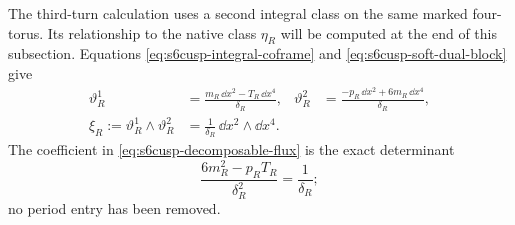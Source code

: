 The third-turn calculation uses a second integral class on the same marked
four-torus.  Its relationship to the native class \(\eta_R\) will be computed
at the end of this subsection.  Equations
\eqref{eq:s6cusp-integral-coframe} and
\eqref{eq:s6cusp-soft-dual-block} give
\begin{align}
 \vartheta_R^1
 &=\frac{m_R\,\dd x^2-T_R\,\dd x^4}{\delta_R},&
 \vartheta_R^2
 &=\frac{-p_R\,\dd x^2+6m_R\,\dd x^4}{\delta_R},
 \label{eq:s6cusp-decomposable-coframe}\\
 \xi_R:=\vartheta_R^1\wedge\vartheta_R^2
 &=\frac1{\delta_R}\,\dd x^2\wedge\dd x^4.
 \label{eq:s6cusp-decomposable-flux}
\end{align}
The coefficient in \eqref{eq:s6cusp-decomposable-flux} is the exact
determinant
\[
 \frac{6m_R^2-p_RT_R}{\delta_R^2}=\frac1{\delta_R};
\]
no period entry has been removed.

